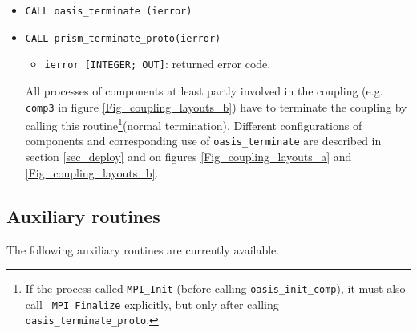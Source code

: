 \begin{itemize}

\item {\tt CALL oasis\_terminate (ierror)}
\item {\tt CALL prism\_terminate\_proto(ierror)}
  \begin{itemize}
  \item {\tt ierror [INTEGER; OUT]}: returned error code.
  \end{itemize}
All processes of components at least partly involved in the coupling (e.g. {\tt comp3} in figure
    \ref{Fig_coupling_layouts_b}) have to terminate the coupling by
  calling this routine\footnote{If the process called {\tt MPI\_Init}
    (before calling {\tt oasis\_init\_comp}), it must also call {\tt
      MPI\_Finalize} explicitly, but only after calling {\tt
      oasis\_terminate\_proto}.}(normal termination). Different configurations of components and corresponding use of {\tt oasis\_terminate} are described in section \ref{sec_deploy} and on figures \ref{Fig_coupling_layouts_a} and \ref{Fig_coupling_layouts_b}.

  

\end{itemize}


\subsection{Auxiliary routines}
\label{subsubsec_auxroutines}

The following auxiliary routines are currently available.

